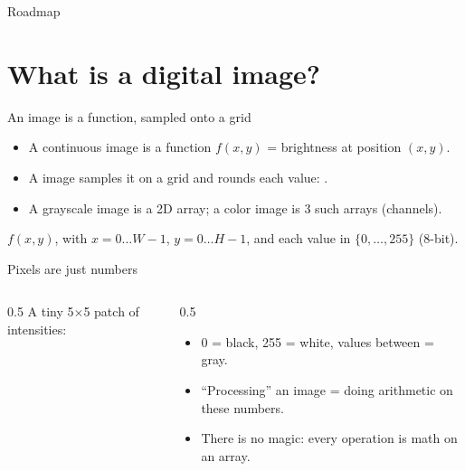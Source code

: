 \documentclass[10pt,aspectratio=169]{beamer}
\begin{document}
\begin{frame}{Roadmap}\tableofcontents\end{frame}

\section{What is a digital image?}

\begin{frame}{An image is a function, sampled onto a grid}
  \begin{itemize}
    \item A continuous image is a function $f(x,y)$ = brightness at position $(x,y)$.
    \item A  image samples it on a grid and rounds each value: .
    \item A grayscale image is a 2D array; a color image is 3 such arrays (channels).
  \end{itemize}
  \begin{mathbox}
    $f(x,y)$, with $x=0\dots W{-}1$, $y=0\dots H{-}1$, and each value in $\{0,\dots,255\}$ (8-bit).
  \end{mathbox}
\end{frame}

\begin{frame}{Pixels are just numbers}
  \begin{columns}[T]
    \begin{column}{0.5\textwidth}
      A tiny 5$\times$5 patch of intensities:
      \begin{center}
      \end{center}
    \end{column}
    \begin{column}{0.5\textwidth}
      \begin{itemize}
        \item 0 = black, 255 = white, values between = gray.
        \item ``Processing'' an image = doing arithmetic on these numbers.
        \item There is no magic: every operation is math on an array.
      \end{itemize}
    \end{column}
  \end{columns}
\end{frame}
\end{document}
